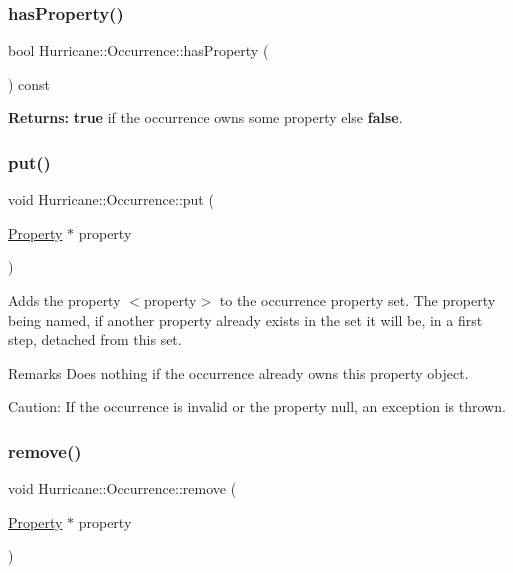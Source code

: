 \subsubsection{\texorpdfstring{has\+Property()}{hasProperty()}}
{\footnotesize\ttfamily bool Hurricane\+::\+Occurrence\+::has\+Property (\begin{DoxyParamCaption}{ }\end{DoxyParamCaption}) const}

{\bfseries Returns\+:} {\bfseries true} if the occurrence owns some property else {\bfseries false}. \mbox{\label{classHurricane_1_1Occurrence_aaea0bdc4f5bb4012eb52f3abe20525be}} 
\subsubsection{\texorpdfstring{put()}{put()}}
{\footnotesize\ttfamily void Hurricane\+::\+Occurrence\+::put (\begin{DoxyParamCaption}\item[{\mbox{\hyperlink{classHurricane_1_1Property}{Property}} $\ast$}]{property }\end{DoxyParamCaption})}

Adds the property {\ttfamily $<$property$>$} to the occurrence property set. The property being named, if another property already exists in the set it will be, in a first step, detached from this set.

\begin{DoxyRemark}{Remarks}
Does nothing if the occurrence already owns this property object.
\end{DoxyRemark}
\begin{DoxyParagraph}{Caution\+: If the occurrence is invalid or the property null, an }
exception is thrown. 
\end{DoxyParagraph}
\mbox{\label{classHurricane_1_1Occurrence_a774404aa5eb01371f64cf5fda3f3ffbf}} 
\subsubsection{\texorpdfstring{remove()}{remove()}}
{\footnotesize\ttfamily void Hurricane\+::\+Occurrence\+::remove (\begin{DoxyParamCaption}\item[{\mbox{\hyperlink{classHurricane_1_1Property}{Property}} $\ast$}]{property }\end{DoxyParamCaption})}

